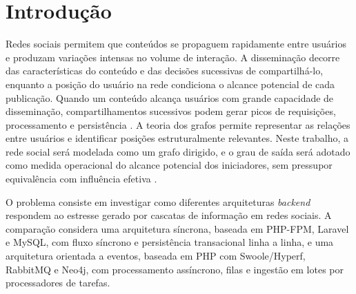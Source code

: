 \estrutura\section{\esp Introdução}

Redes sociais permitem que conteúdos se propaguem rapidamente entre usuários e produzam variações intensas no volume de interação. A disseminação decorre das características do conteúdo e das decisões sucessivas de compartilhá-lo, enquanto a posição do usuário na rede condiciona o alcance potencial de cada publicação. Quando um conteúdo alcança usuários com grande capacidade de disseminação, compartilhamentos sucessivos podem gerar picos de requisições, processamento e persistência \cite{liang2021,sepehr2022}. A teoria dos grafos permite representar as relações entre usuários e identificar posições estruturalmente relevantes. Neste trabalho, a rede social será modelada como um grafo dirigido, e o grau de saída será adotado como medida operacional do alcance potencial dos iniciadores, sem pressupor equivalência com influência efetiva \cite{zareie2023}.

O problema consiste em investigar como diferentes arquiteturas \textit{backend} respondem ao estresse gerado por cascatas de informação em redes sociais. A comparação considera uma arquitetura síncrona, baseada em PHP-FPM, Laravel e MySQL, com fluxo síncrono e persistência transacional linha a linha, e uma arquitetura orientada a eventos, baseada em PHP com Swoole/Hyperf, RabbitMQ e Neo4j, com processamento assíncrono, filas e ingestão em lotes por processadores de tarefas.


